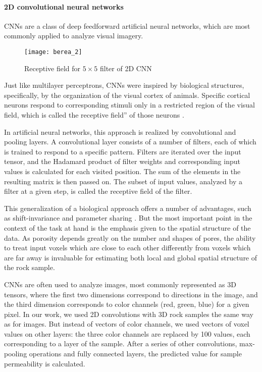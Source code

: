 \documentclass[review]{elsarticle}
\begin{document}
\paragraph{2D convolutional neural networks}

CNNs are a class of deep feedforward artificial neural networks, which are most commonly applied to analyze visual imagery.

\begin{wrapfigure}{r}{0.5\textwidth}
    \centering
    \texttt{[image: berea\_2]}
    \caption{Receptive field for $5 \times 5$ filter of 2D CNN}
\end{wrapfigure}

Just like multilayer perceptrons, CNNs were inspired by biological structures, specifically, by the organization of the visual cortex of animals. Specific cortical neurons respond to corresponding stimuli only in a restricted region of the visual field, which is called the receptive field” of those neurons \cite{matsugu2003subject}.

In artificial neural networks, this approach is realized by convolutional and pooling layers. A convolutional layer consists of a number of filters, each of which is trained to respond to a specific pattern. Filters are iterated over the input tensor, and the Hadamard product of filter weights and corresponding input values is calculated for each visited position. The sum of the elements in the resulting matrix is then passed on. The subset of input values, analyzed by a filter at a given step, is called the receptive field of the filter.

This generalization of a biological approach offers a number of advantages, such as shift-invariance and parameter sharing \cite{lecun2015deep}. But the most important point in the context of the task at hand is the emphasis given to the spatial structure of the data. As porosity depends greatly on the number and shapes of pores, the ability to treat input voxels which are close to each other differently from voxels which are far away is invaluable for estimating both local and global spatial structure of the rock sample.

CNNs are often used to analyze images, most commonly represented as 3D tensors, where the first two dimensions correspond to directions in the image, and the third dimension corresponds to color channels (red, green, blue) for a given pixel. In our work, we used 2D convolutions with 3D rock samples the same way as for images. But instead of vectors of color channels, we used vectors of voxel values on other layers: the three color channels are replaced by 100 values, each corresponding to a layer of the sample. After a series of other convolutions, max-pooling operations and fully connected layers, the predicted value for sample permeability is calculated.
\end{document}
